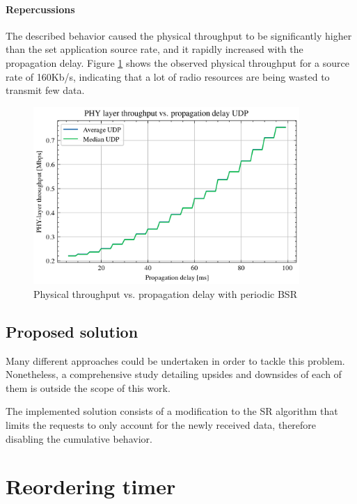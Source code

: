 \paragraph{Repercussions}
The described behavior caused the physical throughput to be significantly higher than the set application source rate, and it rapidly increased with the propagation delay. Figure \ref{fig:phy-thr-runaway} shows the observed physical throughput for a source rate of 160Kb/s, indicating that a lot of radio resources are being wasted to transmit few data.

\begin{figure}[ht]
    \centering
    \includegraphics[width=0.9\textwidth]{res/phy-thr-udp-runaway.png}
    \caption{Physical throughput vs. propagation delay with periodic \ac{BSR}}
    \label{fig:phy-thr-runaway}
\end{figure}

\subsection{Proposed solution}

Many different approaches could be undertaken in order to tackle this problem. Nonetheless, a comprehensive study detailing upsides and downsides of each of them is outside the scope of this work. 

The implemented solution consists of a modification to the \ac{SR} algorithm that limits the requests to only account for the newly received data, therefore disabling the cumulative behavior.

\section{Reordering timer}


